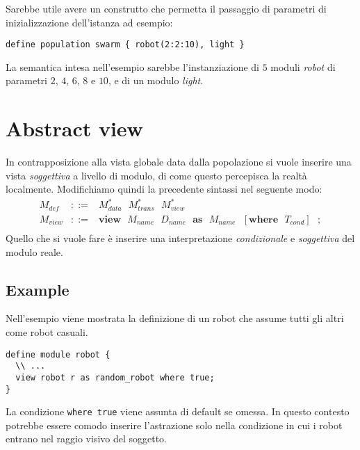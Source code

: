 \documentclass{article}
\begin{document}
Sarebbe utile avere un construtto che permetta il passaggio di parametri di inizializzazione dell'istanza ad esempio:
\begin{verbatim}define population swarm { robot(2:2:10), light }\end{verbatim}
La semantica intesa nell'esempio sarebbe l'instanziazione di $5$ moduli \emph{robot} di parametri $2$, $4$, $6$, $8$ e $10$, e di un modulo \emph{light}.

\section{Abstract view}
In contrapposizione alla vista globale data dalla popolazione si vuole inserire una vista \emph{soggettiva} a livello di modulo, di come questo percepisca la realtà localmente. Modifichiamo quindi la precedente sintassi nel seguente modo:
$$
\begin{array}{lll}
	M_{def} &::=& M_{data}^* \mbox{ } M_{trans}^* \mbox{ } M_{view}^* \\
	M_{view} &::=& \mathbf{view} \mbox{ } M_{name} \mbox{ } D_{name} \mbox{ } \mathbf{as} \mbox{ } M_{name} \mbox{ } [\mathbf{where} \mbox{ } T_{cond}] \mbox{ } \mathbf{;} \\
\end{array}
$$
Quello che si vuole fare è inserire una interpretazione \emph{condizionale} e \emph{soggettiva} del modulo reale.
\subsection{Example}
Nell'esempio viene mostrata la definizione di un robot che assume tutti gli altri come robot casuali.
\begin{verbatim}define module robot {
  \\ ...
  view robot r as random_robot where true;
}
\end{verbatim}
La condizione \texttt{where true} viene assunta di default se omessa. In questo contesto potrebbe essere comodo inserire l'astrazione solo nella condizione in cui i robot entrano nel raggio visivo del soggetto.
\end{document}
